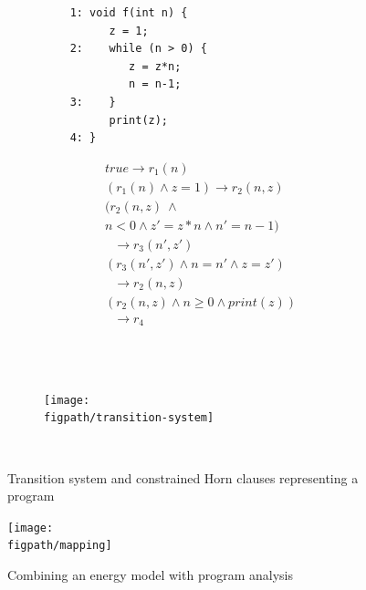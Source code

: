 \documentclass[oneside]{book}
\newcommand{\figpath}{Figs}
\begin{document}
\begin{figure}
  \begin{subfigure}[b]{.49\linewidth}
  \centering
         \begin{lstlisting}
    1: void f(int n) {
          z = 1;
    2:    while (n > 0) {
             z = z*n;
             n = n-1;
    3:    }
          print(z);	
    4: }		
              \end{lstlisting}
    \caption{}
  \end{subfigure}
  \hspace{0.5cm}
  \begin{subfigure}[b]{.49\linewidth}
\begin{center}
\[
     \begin{array}{l}
	true \rightarrow r_1(n)\\
	(r_1(n) \wedge z=1)  \rightarrow r_2(n,z)\\
        (r_2(n,z)~ \wedge \\
	n < 0 \wedge z'=z*n  \wedge n'=n-1)\\
         \ \ \       \rightarrow r_3(n',z')\\
        (r_3(n',z') \wedge n=n' \wedge z=z')\\
        \ \ \         \rightarrow r_2(n,z)\\
        (r_2(n,z) \wedge n \ge 0 \wedge print(z))\\
         \ \ \      \rightarrow r_4	
     \end{array}
\]
    \end{center}
    \caption{}
  \end{subfigure}\\ \\
    \begin{subfigure}[b]{\linewidth}
\begin{center}
\texttt{[image: \\figpath/transition-system]}
    \end{center}
    \caption{}
  \end{subfigure}\\

  \caption{Transition system and constrained Horn clauses representing a program}
  \label{fig-horn}
\end{figure}

\begin{figure}
\texttt{[image: \\figpath/mapping]}   
 \caption{Combining an energy model with program analysis}
 \label{fig-model-mapping}
 \end{figure}
\end{document}
